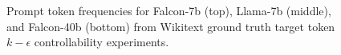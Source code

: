 \documentclass{article} %
\begin{document}
\begin{figure}[htbp]
    \centering
    \caption{Prompt token frequencies for Falcon-7b (top), Llama-7b (middle), and Falcon-40b (bottom) from Wikitext ground truth target token $k-\epsilon$ controllability experiments.}
    \label{fig:main_freqs}
\end{figure}
\end{document}
